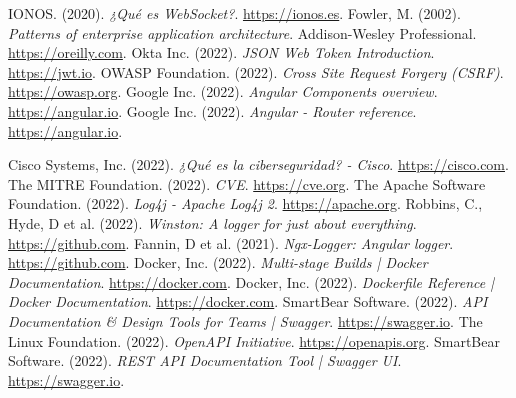 \begin{thebibliography}{99}
     IONOS. (2020). \textit{¿Qué es WebSocket?}. \href{https://www.ionos.es/digitalguide/paginas-web/desarrollo-web/que-es-websocket/}{https://ionos.es}.
     Fowler, M. (2002). \textit{Patterns of enterprise application architecture}. Addison-Wesley Professional. \href{https://www.oreilly.com/library/view/patterns-of-enterprise/0321127420/}{https://oreilly.com}.
     Okta Inc. (2022). \textit{JSON Web Token Introduction}. \href{https://jwt.io/introduction}{https://jwt.io}.
     OWASP Foundation. (2022). \textit{Cross Site Request Forgery (CSRF)}. \href{https://owasp.org/www-community/attacks/csrf}{https://owasp.org}.
     Google Inc. (2022). \textit{Angular Components overview}. \href{https://angular.io/guide/component-overview}{https://angular.io}.
     Google Inc. (2022). \textit{Angular - Router reference}. \href{https://angular.io/guide/router-reference}{https://angular.io}.

     Cisco Systems, Inc. (2022). \textit{¿Qué es la ciberseguridad? - Cisco}. \href{https://www.cisco.com/c/es_mx/products/security/what-is-cybersecurity.html}{https://cisco.com}.
     The MITRE Foundation. (2022). \textit{CVE}. \href{https://www.cve.org}{https://cve.org}.
     The Apache Software Foundation. (2022). \textit{Log4j - Apache Log4j 2}. \href{https://logging.apache.org/log4j/2.x/}{https://apache.org}.
     Robbins, C., Hyde, D et al. (2022). \textit{Winston: A logger for just about everything}. \href{https://github.com/winstonjs/winston}{https://github.com}.
     Fannin, D et al. (2021). \textit{Ngx-Logger: Angular logger}. \href{https://github.com/dbfannin/ngx-logger}{https://github.com}.
     Docker, Inc. (2022). \textit{Multi-stage Builds | Docker Documentation}. \href{https://docs.docker.com/build/building/multi-stage/}{https://docker.com}.
     Docker, Inc. (2022). \textit{Dockerfile Reference | Docker Documentation}. \href{https://docs.docker.com/engine/reference/builder/}{https://docker.com}.
     SmartBear Software. (2022). \textit{API Documentation \& Design Tools for Teams | Swagger}. \href{https://swagger.io}{https://swagger.io}.
     The Linux Foundation. (2022). \textit{OpenAPI Initiative}. \href{https://www.openapis.org}{https://openapis.org}.
     SmartBear Software. (2022). \textit{REST API Documentation Tool | Swagger UI}. \href{https://swagger.io/tools/swagger-ui/}{https://swagger.io}.


\end{thebibliography}
